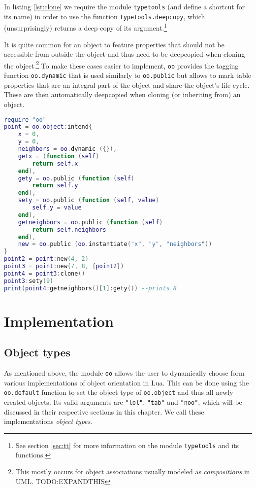 In listing \ref{lst:clone} we require the module \texttt{typetools} (and define a shortcut for its name) in order to use the function \texttt{typetools.deepcopy}, which (unsurprisingly) returns a deep copy of its argument.\footnote{See section \ref{sec:tt} for more information on the module \texttt{typetools} and its functions.}

It is quite common for an object to feature properties that should not be accessible from outside the object and thus need to be deepcopied when cloning the object.\footnote{This mostly occurs for object associations usually modeled as \emph{compositions} in UML. TODO:EXPANDTHIS } To make these cases easier to implement, \texttt{oo} provides the tagging function \texttt{oo.dynamic} that is used similarly to \texttt{oo.public} but allows to mark table properties that are an integral part of the object and share the object's life cycle. These are then automatically deepcopied when cloning (or inheriting from) an object.

\begin{lstlisting}[language=lua, caption={Rewriting listing \ref{lst:clone} using \texttt{oo.dynamic}}, label=lst:dynamic, name=lst:dynamic]
require "oo"
point = oo.object:intend{
	x = 0,
	y = 0,
	neighbors = oo.dynamic ({}),
	getx = (function (self)
		return self.x
	end),
	gety = oo.public (function (self)
		return self.y
	end),
	sety = oo.public (function (self, value)
		self.y = value
	end),
	getneighbors = oo.public (function (self)
		return self.neighbors
	end),
	new = oo.public (oo.instantiate("x", "y", "neighbors"))
}
point2 = point:new(4, 2)
point3 = point:new(7, 8, {point2})
point4 = point3:clone()
point3:sety(9)
print(point4:getneighbors()[1]:gety()) --prints 8
\end{lstlisting}


\section{Implementation}
\label{sec:oo:implementation}

\subsection{Object types}

As mentioned above, the module \texttt{oo} allows the user to dynamically choose form various implementations of object orientation in Lua. This can be done using the \texttt{oo.default} function to set the object type of \texttt{oo.object} and thus all newly created objects. Its valid arguments are \texttt{"lol"}, \texttt{"tab"} and \texttt{"noo"}, which will be discussed in their respective sections in this chapter. We call these implementations \emph{object types}.

